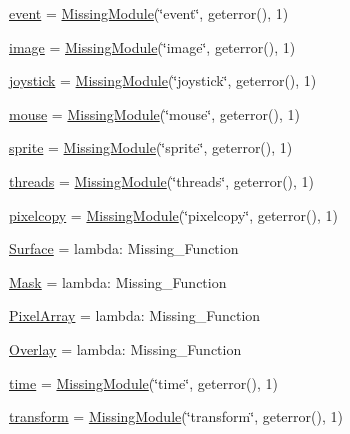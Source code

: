 \begin{DoxyCompactItemize}
\hyperlink{namespacepygame_a0821534ff2a1c38c6c73a43742daebb5}{event} = \hyperlink{classpygame_1_1_missing_module}{Missing\+Module}(\char`\"{}event\char`\"{}, geterror(), 1)
\item 
\hyperlink{namespacepygame_a0d457af554c5ed9426728f64e80cd688}{image} = \hyperlink{classpygame_1_1_missing_module}{Missing\+Module}(\char`\"{}image\char`\"{}, geterror(), 1)
\item 
\hyperlink{namespacepygame_ad8248d6e9e058885a2bb86e449368df9}{joystick} = \hyperlink{classpygame_1_1_missing_module}{Missing\+Module}(\char`\"{}joystick\char`\"{}, geterror(), 1)
\item 
\hyperlink{namespacepygame_ab8b56478ee345a1d7fc1d3d864e449b8}{mouse} = \hyperlink{classpygame_1_1_missing_module}{Missing\+Module}(\char`\"{}mouse\char`\"{}, geterror(), 1)
\item 
\hyperlink{namespacepygame_aa4b7d2ae8175850dd21d2b548f184cb8}{sprite} = \hyperlink{classpygame_1_1_missing_module}{Missing\+Module}(\char`\"{}sprite\char`\"{}, geterror(), 1)
\item 
\hyperlink{namespacepygame_a966adc46b8b79feca6e11c88e40f7059}{threads} = \hyperlink{classpygame_1_1_missing_module}{Missing\+Module}(\char`\"{}threads\char`\"{}, geterror(), 1)
\item 
\hyperlink{namespacepygame_a13815819567b0896f8ea391d551a5f83}{pixelcopy} = \hyperlink{classpygame_1_1_missing_module}{Missing\+Module}(\char`\"{}pixelcopy\char`\"{}, geterror(), 1)
\item 
\hyperlink{namespacepygame_af987790424fd0631c88919974993d66e}{Surface} = lambda\+: Missing\+\_\+\+Function
\item 
\hyperlink{namespacepygame_afdbd3e54b27fd900191957f35330a52c}{Mask} = lambda\+: Missing\+\_\+\+Function
\item 
\hyperlink{namespacepygame_a25e8713bef061178f489f703eea6d25e}{Pixel\+Array} = lambda\+: Missing\+\_\+\+Function
\item 
\hyperlink{namespacepygame_a39a58cb6111c08130fc73988c965865c}{Overlay} = lambda\+: Missing\+\_\+\+Function
\item 
\hyperlink{namespacepygame_a8bfece8a6e15e03662299926a400b0af}{time} = \hyperlink{classpygame_1_1_missing_module}{Missing\+Module}(\char`\"{}time\char`\"{}, geterror(), 1)
\item 
\hyperlink{namespacepygame_a5f9cc11ad1c22771ac675e697d613a95}{transform} = \hyperlink{classpygame_1_1_missing_module}{Missing\+Module}(\char`\"{}transform\char`\"{}, geterror(), 1)
\item 

\end{DoxyCompactItemize}
